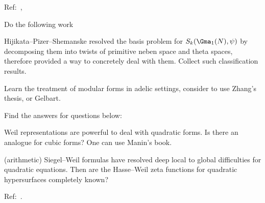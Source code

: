 \documentclass[0-main]{subfiles}
\begin{document}
\ifSubfilesClassLoaded{
	\tableofcontents
}{}


Ref:~\cite{Bump1997}, \cite{GH2024}


\begin{itm}
	\item[\TODO] Do the following work
	\begin{itm}
		\item[\TODO] Hijikata--Pizer--Shemanske\cite{HPS1989Basis} resolved the basis problem for $S_{k}(\Gma_{1}(N),\psi)$ by decomposing them into twists of primitive neben space and theta spaces, therefore provided a way to concretely deal with them. Collect such classification results.
		\item[\TODO] Learn the treatment of modular forms in adelic settings, consider to use Zhang's thesis\cite{Zhang2023Derived}, or Gelbart\cite{Gelbart1975}.
	\end{itm}
\end{itm}



\begin{itm}
	\item[\TODO] Find the answers for questions below:
	\begin{itm}
		\item[\TODO] Weil representations are powerful to deal with quadratic forms. Is there an analogue for cubic forms? One can use Manin's book\cite{MH1974}.
		\item[\TODO] (arithmetic) Siegel--Weil formulas have resolved deep local to global difficulties for quadratic equations. Then are the Hasse--Weil zeta functions for quadratic hypersurfaces completely known?
	\end{itm}
\end{itm}

Ref:~\cite{GGP2012}.

\ifSubfilesClassLoaded{
	
	
}{}
\end{document}
